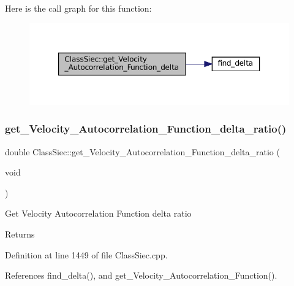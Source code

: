 Here is the call graph for this function\+:
\nopagebreak
\begin{figure}[H]
\begin{center}
\leavevmode
\includegraphics[width=350pt]{classClassSiec_a21be4d09c7aa47a5d3f216509ad5feef_cgraph}
\end{center}
\end{figure}
\mbox{\label{classClassSiec_af6d6dbab3224e645c67e6c7dd2e02378}} 
\subsubsection{\texorpdfstring{get\+\_\+\+Velocity\+\_\+\+Autocorrelation\+\_\+\+Function\+\_\+delta\+\_\+ratio()}{get\_Velocity\_Autocorrelation\_Function\_delta\_ratio()}}
{\footnotesize\ttfamily double Class\+Siec\+::get\+\_\+\+Velocity\+\_\+\+Autocorrelation\+\_\+\+Function\+\_\+delta\+\_\+ratio (\begin{DoxyParamCaption}\item[{void}]{ }\end{DoxyParamCaption})}

Get Velocity Autocorrelation Function delta ratio \begin{DoxyReturn}{Returns}

\end{DoxyReturn}


Definition at line 1449 of file Class\+Siec.\+cpp.



References find\+\_\+delta(), and get\+\_\+\+Velocity\+\_\+\+Autocorrelation\+\_\+\+Function().

